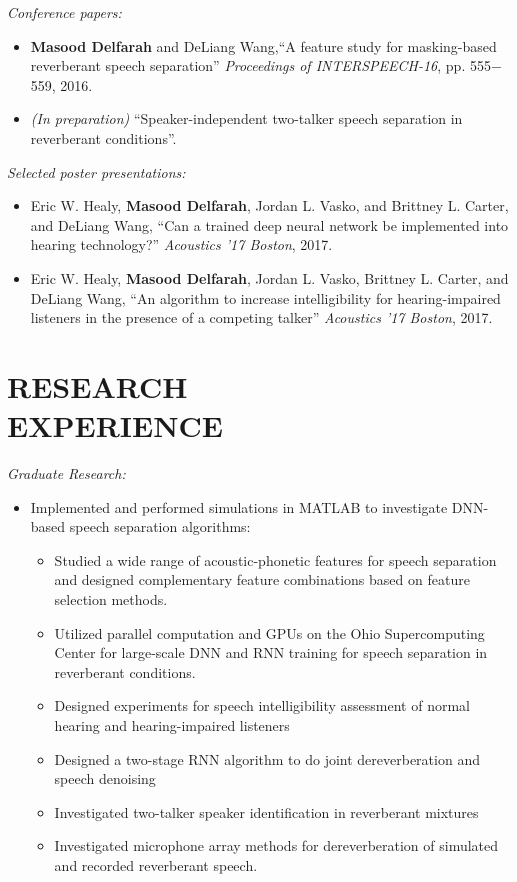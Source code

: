 \documentclass[margin, 10pt]{res}
\begin{document}
\begin{resume}
\textit{Conference papers:}
\begin{itemize}
\item \textbf{Masood Delfarah} and DeLiang Wang,``A feature study for masking-based reverberant speech separation'' \textit{Proceedings of INTERSPEECH-16}, pp. 555$-$559, 2016.
\item \textit{(In preparation)} ``Speaker-independent two-talker speech separation in reverberant conditions''.
\end{itemize}

\textit{Selected poster presentations:}
\begin{itemize}
\item Eric W. Healy, \textbf{Masood Delfarah}, Jordan L. Vasko, and Brittney L. Carter, and DeLiang Wang, ``Can a trained deep neural network be implemented into hearing technology?'' \textit{Acoustics '17 Boston}, 2017.
\item Eric W. Healy, \textbf{Masood Delfarah}, Jordan L. Vasko, Brittney L. Carter, and DeLiang Wang, ``An algorithm to increase intelligibility for hearing-impaired listeners in the presence of a competing talker'' \textit{Acoustics '17 Boston}, 2017.
\end{itemize}

\section{RESEARCH \\ EXPERIENCE}
\textit{Graduate Research:}
\begin{itemize}
\item Implemented and performed simulations in MATLAB to investigate DNN-based speech separation algorithms:
	\begin{itemize}
	\item Studied a wide range of acoustic-phonetic features for speech separation and designed complementary feature combinations based on feature selection methods.
	\item Utilized parallel computation and GPUs on the Ohio Supercomputing Center for large-scale DNN and RNN training for speech separation in reverberant conditions.
	\item Designed experiments for speech intelligibility assessment of normal hearing and hearing-impaired listeners
	\item Designed a two-stage RNN algorithm to do joint dereverberation and speech denoising
	\item Investigated two-talker speaker identification in reverberant mixtures
	\item Investigated microphone array methods for dereverberation of simulated and recorded reverberant speech.
	\end{itemize}


\end{itemize}
\end{resume}
\end{document}
